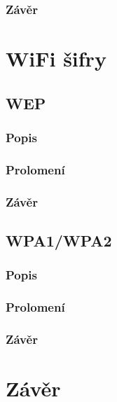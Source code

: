\documentclass[12pt, a4paper]{article}
\begin{document}
		\subsubsection{Závěr}
\section{WiFi šifry}
\label{sec:wifi}
	\subsection{WEP}
		\label{subsec:wep}
		\subsubsection{Popis}
		\subsubsection{Prolomení}
		\subsubsection{Závěr}
	\subsection{WPA1/WPA2}
		\label{subsec:wpa}
		\subsubsection{Popis}
		\subsubsection{Prolomení}
		\subsubsection{Závěr}

\section{Závěr}
\end{document}
